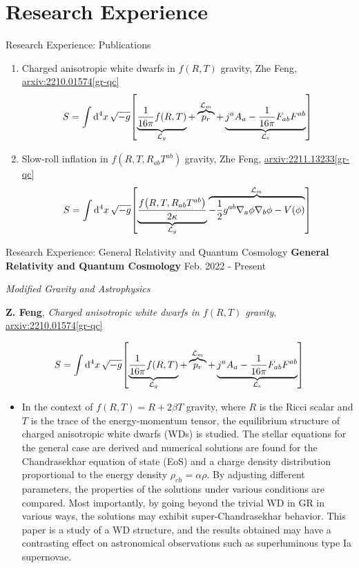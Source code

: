 \documentclass[9pt,aspectratio=169,hyperref=colorlinks]{beamer}
\begin{document}
\section{Research Experience}
\begin{frame}{Research Experience: Publications}
    \begin{enumerate}
        \item Charged anisotropic white dwarfs in $f\left({R}, {T}\right)$ gravity, Zhe Feng, \href{https://arxiv.org/abs/2210.01574}{arxiv:2210.01574[gr-qc]} \[S = \int \dd[4]{x} \sqrt{-g} \qty[\underbrace{\frac{1}{16 \pi} f(R, T)}_{\mathcal{L}_g} + \overbrace{p_r}^{\mathcal{L}_m} + \underbrace{j^a A_a - \frac{1}{16 \pi} F_{ab} F^{ab}}_{\mathcal{L}_e}]\]
        \item Slow-roll inflation in $f\left(R, T, R_{ab}T^{ab}\right)$ gravity, Zhe Feng, \href{https://arxiv.org/abs/2211.13233}{arxiv:2211.13233[gr-qc]} \[S = \int \dd[4]{x} \sqrt{-g} \qty[\underbrace{\frac{f\qty(R, T, R_{ab}T^{ab})}{2 \kappa}}_{\mathcal{L}_g} \overbrace{- \frac{1}{2} g^{ab} \nabla_{a} \phi \nabla_{b} \phi - V(\phi)}^{\mathcal{L}_m}]\]
    \end{enumerate}
\end{frame}

\begin{frame}{Research Experience: General Relativity and Quantum Cosmology}
    \textbf{General Relativity and Quantum Cosmology} \hfill Feb. 2022 - Present

    \smallskip \quad \textit{Modified Gravity and Astrophysics}

    \textbf{Z. Feng}, \textit{Charged anisotropic white dwarfs in $f\left({R}, {T}\right)$ gravity}, \href{https://arxiv.org/abs/2210.01574}{arxiv:2210.01574[gr-qc]}

    \[S = \int \dd[4]{x} \sqrt{-g} \qty[\underbrace{\frac{1}{16 \pi} f(R, T)}_{\mathcal{L}_g} + \overbrace{p_r}^{\mathcal{L}_m} + \underbrace{j^a A_a - \frac{1}{16 \pi} F_{ab} F^{ab}}_{\mathcal{L}_e}]\]

    \begin{itemize}
        \item In the context of $f(R, T) = R + 2 \beta T$ gravity, where $R$ is the Ricci scalar and $T$ is the trace of the energy-momentum tensor, the equilibrium structure of charged anisotropic white dwarfs (WDs) is studied. The stellar equations for the general case are derived and numerical solutions are found for the Chandrasekhar equation of state (EoS) and a charge density distribution proportional to the energy density $\rho_{ch} = \alpha \rho$. By adjusting different parameters, the properties of the solutions under various conditions are compared. Most importantly, by going beyond the trivial WD in GR in various ways, the solutions may exhibit super-Chandrasekhar behavior. This paper is a study of a WD structure, and the results obtained may have a contrasting effect on astronomical observations such as superluminous type Ia supernovae.
    \end{itemize}
\end{frame}
\end{document}
